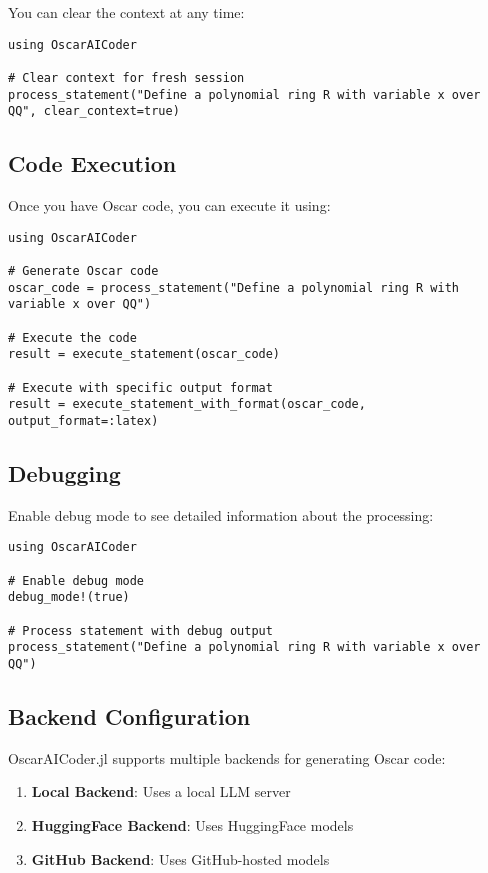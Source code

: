 \documentclass[11pt,a4paper]{article}
\begin{document}
You can clear the context at any time:

\begin{lstlisting}
using OscarAICoder

# Clear context for fresh session
process_statement("Define a polynomial ring R with variable x over QQ", clear_context=true)
\end{lstlisting}

\subsection{Code Execution}

Once you have Oscar code, you can execute it using:

\begin{lstlisting}
using OscarAICoder

# Generate Oscar code
oscar_code = process_statement("Define a polynomial ring R with variable x over QQ")

# Execute the code
result = execute_statement(oscar_code)

# Execute with specific output format
result = execute_statement_with_format(oscar_code, output_format=:latex)
\end{lstlisting}

\subsection{Debugging}

Enable debug mode to see detailed information about the processing:

\begin{lstlisting}
using OscarAICoder

# Enable debug mode
debug_mode!(true)

# Process statement with debug output
process_statement("Define a polynomial ring R with variable x over QQ")
\end{lstlisting}

\subsection{Backend Configuration}

OscarAICoder.jl supports multiple backends for generating Oscar code:

\begin{enumerate}
    \item \textbf{Local Backend}: Uses a local LLM server
    \item \textbf{HuggingFace Backend}: Uses HuggingFace models
    \item \textbf{GitHub Backend}: Uses GitHub-hosted models
\end{enumerate}
\end{document}
